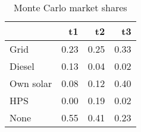 \begin{table}[!ht]
	\centering
		\caption{Monte Carlo market shares}
\begin{tabular}{lrrr}
		\toprule
               &        t1&        t2&        t3\\
		\midrule
		           Grid&      0.23&      0.25&      0.33\\
		         Diesel&      0.13&      0.04&      0.02\\
		      Own solar&      0.08&      0.12&      0.40\\
		            HPS&      0.00&      0.19&      0.02\\
		           None&      0.55&      0.41&      0.23\\
		\bottomrule
	\end{tabular}
\end{table}
